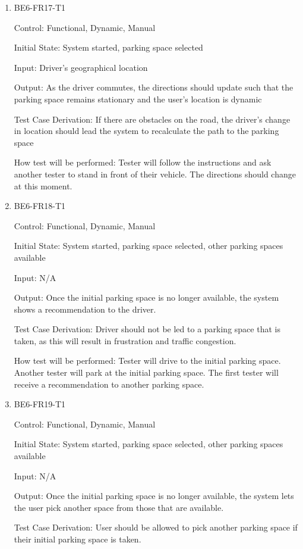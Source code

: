 \documentclass[12pt, titlepage]{article}
\begin{document}
\begin{enumerate}

\item{BE6-FR17-T1}

Control: Functional, Dynamic, Manual
					
Initial State: System started, parking space selected
					
Input: Driver's geographical location
					
Output: As the driver commutes, the directions should update such that the
parking space remains stationary and the user's location is dynamic

Test Case Derivation: If there are obstacles on the road, the driver's change in
location should lead the system to recalculate the path to the parking space
					
How test will be performed: Tester will follow the instructions and ask another
tester to stand in front of their vehicle. The directions should change at this
moment.

\item{BE6-FR18-T1}

Control: Functional, Dynamic, Manual
					
Initial State: System started, parking space selected, other parking spaces
available
					
Input: N/A
					
Output: Once the initial parking space is no longer available, the system shows
a recommendation to the driver.

Test Case Derivation: Driver should not be led to a parking space that is taken,
as this will result in frustration and traffic congestion.
					
How test will be performed: Tester will drive to the initial parking space.
Another tester will park at the initial parking space. The first tester will
receive a recommendation to another parking space.

\item{BE6-FR19-T1}

Control: Functional, Dynamic, Manual
					
Initial State: System started, parking space selected, other parking spaces
available
					
Input: N/A
					
Output: Once the initial parking space is no longer available, the system lets
the user pick another space from those that are available.

Test Case Derivation: User should be allowed to pick another parking space if
their initial parking space is taken.
					

\end{enumerate}
\end{document}
